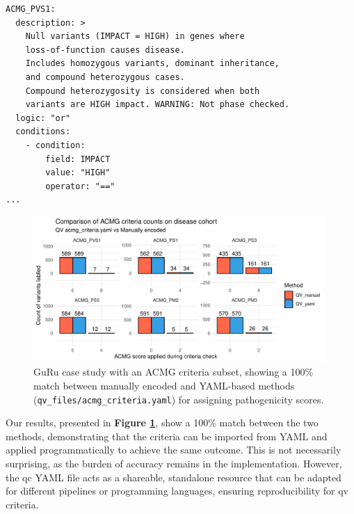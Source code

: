 \begin{tcolorbox}[
    colback=white!0,  %
    colframe=black,  %
    boxrule=1pt,  %
    arc=1mm,  %
    outer arc=1mm,
   title=\textbf{\refstepcounter{myboxcounter}\label{box:acmg_criteria_yaml}Box \themyboxcounter: qv\_files/acmg\_criteria.yaml}
]

\begin{verbatim}
ACMG_PVS1:
  description: >
    Null variants (IMPACT = HIGH) in genes where 
    loss-of-function causes disease.
    Includes homozygous variants, dominant inheritance, 
    and compound heterozygous cases.
    Compound heterozygosity is considered when both 
    variants are HIGH impact. WARNING: Not phase checked.
  logic: "or"
  conditions:
    - condition:
        field: IMPACT
        value: "HIGH"
        operator: "=="
...
\end{verbatim}
\end{tcolorbox}


\begin{figure}[!h]
\centering
\includegraphics[width=0.99\textwidth]{./images/Guru_singlecase_validation_of_yaml_vs_manual.pdf}
\caption{GuRu case study with an ACMG criteria subset, showing a 100\% match between manually encoded and YAML-based methods (\texttt{qv\_files/acmg\_criteria.yaml}) for assigning pathogenicity scores.}
\label{fig:guru_case_study_result}
\end{figure}

Our results, presented in \textbf{Figure \ref{fig:guru_case_study_result}}, show a 100\% match between the two methods, demonstrating that the criteria can be imported from YAML and applied programmatically to achieve the same outcome. This is not necessarily surprising, as the burden of accuracy remains in the implementation. However, the \ac{qc} YAML file acts as a shareable, standalone resource that can be adapted for different pipelines or programming languages, ensuring reproducibility for \ac{qv} criteria.

